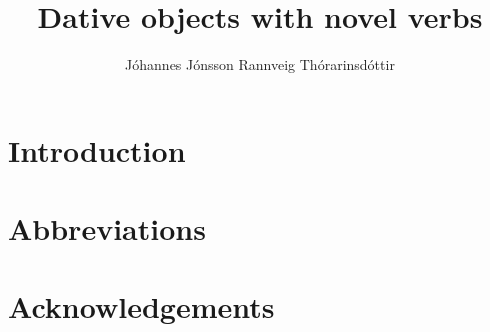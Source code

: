 \documentclass[output=paper,modfonts,nonflat]{langsci/langscibook}
\author{Jóhannes Jónsson\affiliation{}\lastand
Rannveig Thórarinsdóttir\affiliation{}}
\title{Dative objects with novel verbs}
\begin{document}
\section{Introduction}  
 
\section*{Abbreviations}
\section*{Acknowledgements}

\sloppy
\printbibliography[heading=subbibliography,notkeyword=this] 
\end{document}
